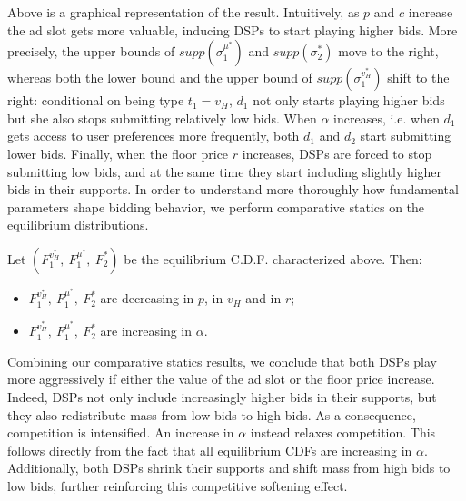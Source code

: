 \noindent Above is a graphical representation of the result. Intuitively, as $ p $ and $ c $ increase the ad slot gets more valuable, inducing DSPs to start playing higher bids. More precisely, the upper bounds of $ supp( \sigma_1^{\mu^*} ) $ and $ supp\left( \sigma_2^* \right) $ move to the right, whereas both the lower bound and the upper bound of $ supp\left( \sigma_1^{v_H^*} \right) $ shift to the right: conditional on being type $ t_1 = v_H $, $ d_1 $ not only starts playing higher bids but she also stops submitting relatively low bids. When $ \alpha $ increases, i.e. when $ d_1 $ gets access to user preferences more frequently, both $ d_1 $ and $ d_2 $ start submitting lower bids. Finally, when the floor price $ r $ increases, DSPs are forced to stop submitting low bids, and at the same time they start including slightly higher bids in their supports. In order to understand more thoroughly how fundamental parameters shape bidding behavior, we perform comparative statics on the equilibrium distributions.

\begin{cor}
Let $ \left( F_1^{v_H^*},\ F_1^{\mu^*},\ F_2^*  \right) $ be the equilibrium C.D.F. characterized above. Then:

\begin{itemize}
    \item[1.] $ F_1^{v_H^*},\ F_1^{\mu^*},\ F_2^* $ are decreasing in $ p $, in $ v_H $ and in $ r $;

    

    \item[2.] $ F_1^{v_H^*},\ F_1^{\mu^*},\ F_2^* $ are increasing in $ \alpha $.
\end{itemize}

\end{cor}

\noindent Combining our comparative statics results, we conclude that both DSPs play more aggressively if either the value of the ad slot or the floor price increase. Indeed, DSPs not only include increasingly higher bids in their supports, but they also redistribute mass from low bids to high bids. As a consequence, competition is intensified. An increase in $ \alpha $ instead relaxes competition. This follows directly from the fact that all equilibrium CDFs are increasing in $ \alpha $. Additionally, both DSPs shrink their supports and shift mass from high bids to low bids, further reinforcing this competitive softening effect. \par

